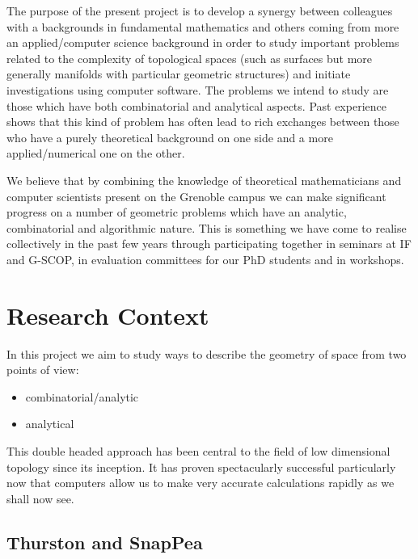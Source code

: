 \documentclass[14pt,fleqn]{article}
\begin{document}
The purpose of the present project is to develop a synergy between colleagues with a backgrounds in fundamental mathematics  and others coming from more an applied/computer science background in order to study important problems related to the complexity of topological spaces 
(such as surfaces but more generally manifolds with particular geometric structures) 
and initiate investigations using computer software.
The problems we intend to study
are those which have both 
combinatorial and analytical aspects. Past experience shows that
this kind of problem 
has often lead to rich exchanges between 
those  
who have a purely theoretical background 
on one side 
and a more  applied/numerical one
on the other.

We believe that by combining the knowledge of theoretical
mathematicians and computer scientists
present on the Grenoble campus 
we can make significant progress 
on a number of geometric problems 
which have an analytic, combinatorial and algorithmic nature. 
This is something we have come to realise collectively
in the past few years 
through participating together in seminars at IF and G-SCOP, in evaluation committees for our PhD students 
and in workshops.


\section{Research Context}

In this project we aim to study ways to describe the geometry of space from two points of view: 
\begin{itemize}
\item combinatorial/analytic
\item analytical
\end{itemize} 
This double headed approach has been central to the field of low dimensional topology since its inception.
It  has proven spectacularly successful 
particularly now that computers allow us 
to make very accurate calculations rapidly as we shall now see. 



\subsection{Thurston and SnapPea}
\end{document}

